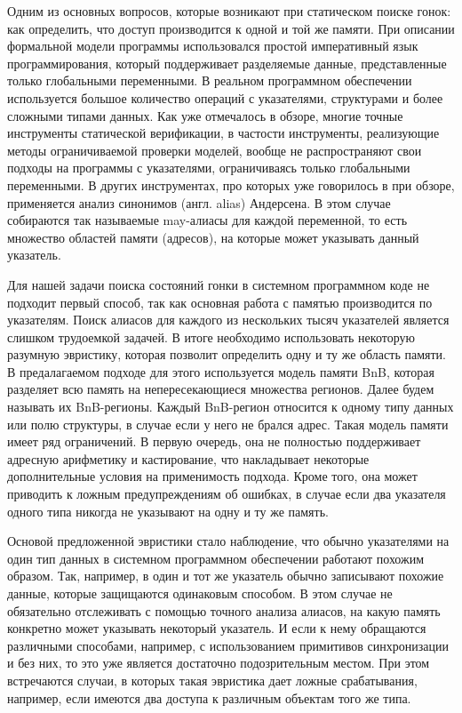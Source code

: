 Одним из основных вопросов, которые возникают при статическом поиске гонок: как определить, что доступ производится к одной и той же памяти.
При описании формальной модели программы использовался простой императивный язык программирования, который поддерживает разделяемые данные, представленные только глобальными переменными.
В реальном программном обеспечении используется большое количество операций с указателями, структурами и более сложными типами данных.
Как уже отмечалось в обзоре, многие точные инструменты статической верификации, в частости инструменты, реализующие методы ограничиваемой проверки моделей, вообще не распространяют свои подходы на программы с указателями, ограничиваясь только глобальными переменными.
В других инструментах, про которых уже говорилось в при обзоре, применяется анализ синонимов (англ. alias) Андерсена.
В этом случае собираются так называемые may-алиасы для каждой переменной, то есть множество областей памяти (адресов), на которые может указывать данный указатель.

Для нашей задачи поиска состояний гонки в системном программном коде не подходит первый способ, так как основная работа с памятью производится по указателям.
Поиск алиасов для каждого из нескольких тысяч указателей является слишком трудоемкой задачей.
В итоге необходимо использовать некоторую разумную эвристику, которая позволит определить одну и ту же область памяти. 
В предалагаемом подходе для этого используется модель памяти BnB, которая разделяет всю память на непересекающиеся множества регионов.
Далее будем называть их BnB-регионы.
Каждый BnB-регион относится к одному типу данных или полю структуры, в случае если у него не брался адрес.
Такая модель памяти имеет ряд ограничений. В первую очередь, она не полностью поддерживает адресную арифметику и кастирование, что накладывает некоторые дополнительные условия на применимость подхода.
Кроме того, она может приводить к ложным предупреждениям об ошибках, в случае если два указателя одного типа никогда не указывают на одну и ту же память.

Основой предложенной эвристики стало наблюдение, что обычно указателями на один тип данных в системном программном обеспечении работают похожим образом.
Так, например, в один и тот же указатель обычно записывают похожие данные, которые защищаются одинаковым способом.
В этом случае не обязательно отслеживать с помощью точного анализа алиасов, на какую память конкретно может указывать некоторый указатель.
И если к нему обращаются различными способами, например, с использованием примитивов синхронизации и без них, то это уже является достаточно подозрительным местом.
При этом встречаются случаи, в которых такая эвристика дает ложные срабатывания, например, если имеются два доступа к различным объектам того же типа.

